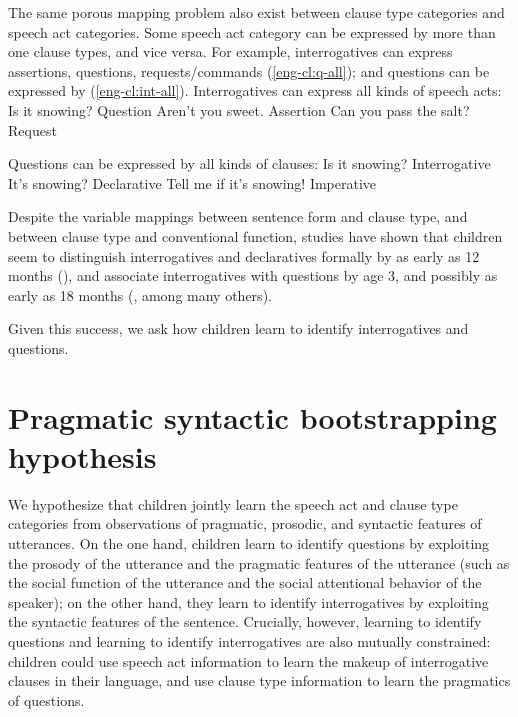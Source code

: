 The same porous mapping problem also exist between clause type categories and speech act categories. Some speech act category can be expressed by more than one clause types, and vice versa. For example, interrogatives can express assertions, questions, requests/commands (\ref{eng-cl:q-all}); and questions can be expressed by \diis{} (\ref{eng-cl:int-all}).
Interrogatives can express all kinds of speech acts:
\bxl Is it snowing? \hfill Question
\ex Aren't you sweet. \hfill Assertion
\ex Can you pass the salt? \hfill Request
\exl
\eex

Questions can be expressed by all kinds of clauses:
\bxl
Is it snowing? \hfill Interrogative
\ex It's snowing? \hfill Declarative
\ex Tell me if it's snowing! \hfill Imperative
\exl
\eex



Despite the variable mappings between sentence form and clause type, and between clause type and conventional function, studies have shown that children seem to distinguish interrogatives and declaratives formally by as early as 12 months (\cite{geffenmintz2015wordorder}), and associate interrogatives with questions by age 3, and possibly as early as 18 months (\citealt{tyack1977, ervintripp1978, berningergarvey1981, rowland2003cdswh, seidl2003wh, casillas2013,casillas2017turn, clark2015turn, lammertink2015turn, gagliardi2016wh, perkins2020filler}, among many others).

Given this success, we ask how children learn to identify interrogatives and questions. 

\section{Pragmatic syntactic bootstrapping hypothesis}
\label{sec:intro:prag-syn-bootstrap}



We hypothesize that children jointly learn the speech act and clause type categories from observations of pragmatic, prosodic, and syntactic features of utterances. On the one hand, children learn to identify questions by exploiting the prosody of the utterance and the pragmatic features of the utterance (such as the social function of the utterance and the social attentional behavior of the speaker); on the other hand, they learn to identify interrogatives by exploiting the syntactic features of the sentence. Crucially, however, learning to identify questions and learning to identify interrogatives are also mutually constrained: children could use speech act information to learn the makeup of interrogative clauses in their language, and use clause type information to learn the pragmatics of questions. 


